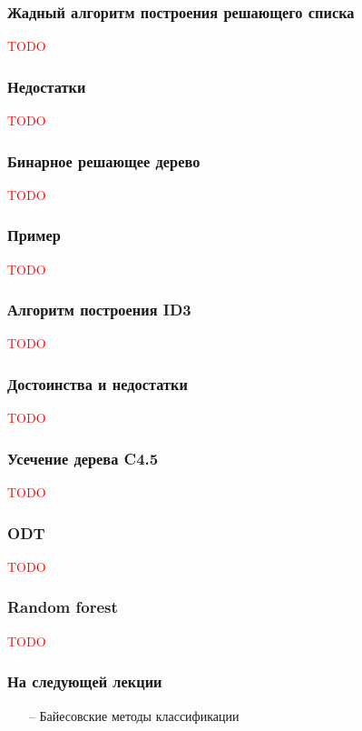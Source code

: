 \documentclass[12pt]{beamer}
\begin{document}
\begin{frame}\frametitle{Жадный алгоритм построения решающего списка}
\textcolor{red}{TODO}
\end{frame}

\begin{frame}\frametitle{Недостатки}
\textcolor{red}{TODO}
\end{frame}

\begin{frame}\frametitle{Бинарное решающее дерево}
\textcolor{red}{TODO}
\end{frame}

\begin{frame}\frametitle{Пример}
\textcolor{red}{TODO}
\end{frame}

\begin{frame}\frametitle{Алгоритм построения ID3}
\textcolor{red}{TODO}
\end{frame}

\begin{frame}\frametitle{Достоинства и недостатки}
\textcolor{red}{TODO}
\end{frame}

\begin{frame}\frametitle{Усечение дерева C4.5}
\textcolor{red}{TODO}
\end{frame}

\begin{frame}\frametitle{ODT}
\textcolor{red}{TODO}
\end{frame}

\begin{frame}\frametitle{Random forest}
\textcolor{red}{TODO}
\end{frame}

\begin{frame}\frametitle{На следующей лекции}
\begin{itemize}
\item[--] Байесовские методы классификации
\end{itemize}
\end{frame}
\end{document}
